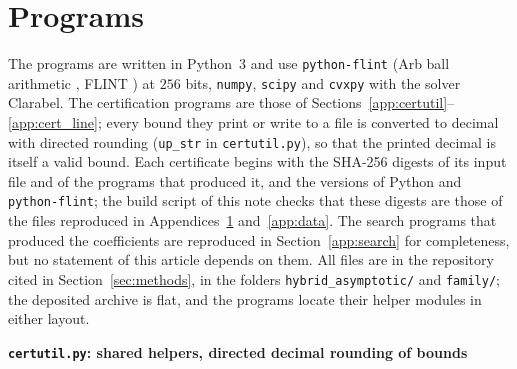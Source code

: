 \documentclass[11pt,reqno]{amsart}
\makeatletter
\let\CG@origcite\cite
\renewcommand*{\cite}[2][]{\def\CG@citekey{#2}%
  \ifx\relax#1\relax\CG@origcite{#2}\else\CG@origcite[#1]{#2}\fi}
\numberwithin{equation}{section}
\theoremstyle{definition}
\theoremstyle{remark}
\newcommand{\appsub}[1]{\par\medskip\noindent\textbf{#1}\par\nobreak\smallskip}
\makeatother
\begin{document}
\section{Programs}\label{app:code}
The programs are written in Python~3 and use \texttt{python-flint} (Arb ball arithmetic \cite{Johansson2017}, FLINT \cite{FLINT}) at $256$ bits, \texttt{numpy}, \texttt{scipy} and \texttt{cvxpy} with the solver Clarabel. The certification programs are those of Sections~\ref{app:certutil}--\ref{app:cert_line}; every bound they print or write to a file is converted to decimal with directed rounding (\texttt{up\_str} in \texttt{certutil.py}), so that the printed decimal is itself a valid bound. Each certificate begins with the SHA-256 digests of its input file and of the programs that produced it, and the versions of Python and \texttt{python-flint}; the build script of this note checks that these digests are those of the files reproduced in Appendices~\ref{app:code} and~\ref{app:data}. The search programs that produced the coefficients are reproduced in Section~\ref{app:search} for completeness, but no statement of this article depends on them. All files are in the repository cited in Section~\ref{sec:methods}, in the folders \texttt{hybrid\_asymptotic/} and \texttt{family/}; the deposited archive is flat, and the programs locate their helper modules in either layout.
\appsub{\texttt{certutil.py}: shared helpers, directed decimal rounding of bounds}
\label{app:certutil}
\end{document}
